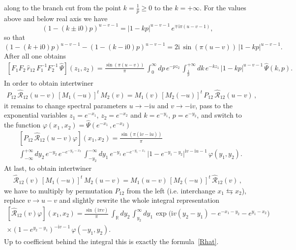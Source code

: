 \documentclass[11pt]{article}
\numberwithin{equation}{section}
\theoremstyle{plain}
\theoremstyle{definition}
\renewcommand{\phi}{\varphi}
\renewcommand{\imath}{\mathrm{i}}
\begin{document}
along to the branch cut from the point $k = \frac{1}{p} \geq 0$ to the $k = +\infty$. 
For the values above and below real axis we have 
$$
(1-(k\pm \imath0) p)^{u-v-1} = |1-k p|^{u-v-1}\,e^{\mp \imath\pi(u-v-1)},
$$  
so that  
$$
(1-(k+\imath0) p)^{u-v-1} - (1-(k-\imath0) p)^{u-v-1} =  
2\imath\,\sin(\pi(u-v))\,|1-k p|^{u-v-1}.
$$
After all one obtains 
\begin{align*}
	\left[F_1 F_2\,\hat{r}_{12}\,F_1^{-1} F_2^{-1}\,\hat{\Psi}\right](z_1,z_2) 
	= \frac{\sin(\pi(u-v))}{\pi}\,
	\int_{0}^{\infty} d p\,e^{-p z_2}\,
	\int_{\frac{1}{p}}^{+\infty} d k\,e^{-k z_1 }\,|1-k p|^{u-v-1}\,\hat{\Psi}(k,p) .
\end{align*}
In order to obtain intertwiner 
\begin{align}
	P_{12}\,\widehat{\mathcal{R}}_{12}(u-v)\,
	\left[M_1(-u)\right]^t\,M_{2}(v)
	= M_{1}(v)\,\left[M_2(-u)\right]^t\,
	P_{12}\,\widehat{\mathcal{R}}_{12}(u-v) \,, 
\end{align}
it remains to change spectral parameters $u \to -\imath u$ and $v \to -\imath v$, pass to the exponential variables $z_1 = e^{-x_1}$, $z_2 = e^{-x_2}$ and
$k = e^{-y_1}$, $p = e^{-y_2}$, and switch to the function 
$\phi(x_1\,,x_2) = \hat{\Psi}\left(e^{-x_1}\,,e^{-x_2}\right)$ 
\begin{align*}
	&\left[P_{12}\,\widehat{\mathcal{R}}_{12}(u-v)\phi\right](x_1,x_2) 
	= \frac{\sin(\pi(\imath v- \imath u))}{\pi}\,\\[6pt]
	&\int_{-\infty}^{+\infty} d y_2\, e^{-y_2}\,e^{-e^{-y_2-x_2}}\,
	\int_{-y_2}^{-\infty} d y_1\ e^{-y_1}\,e^{-e^{-y_1-x_1}}\,
	|1-e^{-y_1-y_2}|^{\imath v-\imath u-1}\,\phi(y_1,y_2) .
\end{align*}
At last, to obtain intertwiner 
\begin{align}
	\widehat{\mathcal{R}}_{12}(v)\,
	\left[M_1(-u)\right]^t\,M_{2}(u-v)
	= M_{1}(u-v)\,\left[M_2(-u)\right]^t\,
	\widehat{\mathcal{R}}_{12}(v) \,, 
\end{align}
we have to multiply by permutation $P_{12}$ from the left (i.e. interchange $x_1 \leftrightarrows x_2$), replace $v \to u-v$ and slightly rewrite  
the whole integral representation
\begin{multline*}
	\left[\widehat{\mathcal{R}}_{12}(v)\phi\right](x_1,x_2) 
	= \frac{\sin(\imath \pi v)}{\pi}\,\int_\mathbb{R} dy_2 \, \int_{y_2}^\infty dy_1 \, \exp \bigl( \imath v (y_2 - y_1) - e^{-x_1 - y_2} - e^{y_1- x_2 } \bigr) \\[6pt]
	\times (1 - e^{y_2 - y_1})^{-\imath v - 1} \, \phi(-y_1, y_2).
\end{multline*}
Up to coefficient behind the integral this is exactly the formula~\eqref{Rhat}.
\end{document}
